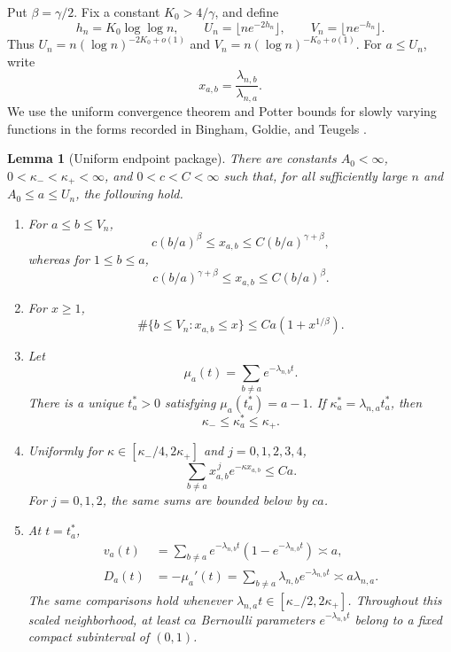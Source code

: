 \documentclass[11pt]{article}
\newtheorem{lemma}[theorem]{Lemma}
\theoremstyle{remark}
\begin{document}
Put $\beta=\gamma/2$.  Fix a constant $K_0>4/\gamma$, and define
\[
        h_n=K_0\log\log n,
        \qquad
        U_n=\lfloor ne^{-2h_n}\rfloor,
        \qquad
        V_n=\lfloor ne^{-h_n}\rfloor.
\]
Thus $U_n=n(\log n)^{-2K_0+o(1)}$ and
$V_n=n(\log n)^{-K_0+o(1)}$.  For $a\le U_n$, write
\[
        x_{a,b}=\frac{\lambda_{n,b}}{\lambda_{n,a}}.
\]
We use the uniform convergence theorem and Potter bounds for slowly varying
functions in the forms recorded in Bingham, Goldie, and Teugels
\cite[Theorems 1.2.1 and 1.5.6]{BGT1987}.

\begin{lemma}[Uniform endpoint package]\label{lem:global-endpoint-package}
There are constants $A_0<\infty$,
$0<\kappa_-<\kappa_+<\infty$, and $0<c<C<\infty$ such that, for all
sufficiently large $n$ and $A_0\le a\le U_n$, the following hold.

\begin{enumerate}[label=(\roman*)]
\item For $a\le b\le V_n$,
\[
        c(b/a)^\beta\le x_{a,b}
        \le C(b/a)^{\gamma+\beta},
\]
whereas for $1\le b\le a$,
\[
        c(b/a)^{\gamma+\beta}\le x_{a,b}
        \le C(b/a)^\beta.
\]

\item For $x\ge1$,
\[
        \#\{b\le V_n:x_{a,b}\le x\}
        \le Ca(1+x^{1/\beta}).
\]

\item Let
\[
        \mu_a(t)=\sum_{b\ne a}e^{-\lambda_{n,b}t}.
\]
There is a unique $t_a^*>0$ satisfying $\mu_a(t_a^*)=a-1$.  If
$\kappa_a^*=\lambda_{n,a}t_a^*$, then
\[
        \kappa_-\le\kappa_a^*\le\kappa_+.
\]

\item Uniformly for
$\kappa\in[\kappa_-/4,2\kappa_+]$ and $j=0,1,2,3,4$,
\[
        \sum_{b\ne a}x_{a,b}^{\,j}e^{-\kappa x_{a,b}}\le Ca.
\]
For $j=0,1,2$, the same sums are bounded below by $ca$.

\item At $t=t_a^*$,
\[
\begin{aligned}
        v_a(t)&=\sum_{b\ne a}e^{-\lambda_{n,b}t}
        (1-e^{-\lambda_{n,b}t})\asymp a,\\
        D_a(t)&=-\mu_a'(t)
        =\sum_{b\ne a}\lambda_{n,b}e^{-\lambda_{n,b}t}
        \asymp a\lambda_{n,a}.
\end{aligned}
\]
The same comparisons hold whenever
$\lambda_{n,a}t\in[\kappa_-/2,2\kappa_+]$.  Throughout this scaled
neighborhood, at least $ca$ Bernoulli parameters
$e^{-\lambda_{n,b}t}$ belong to a fixed compact subinterval of $(0,1)$.
\end{enumerate}
\end{lemma}
\end{document}
